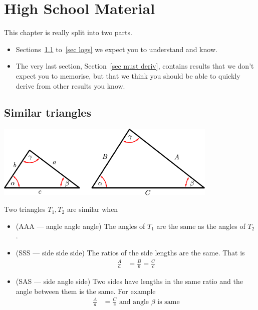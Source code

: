 %
%
\graphicspath{{figures/highschool/}}
\chapter{High School Material}\label{app highschool}
This chapter is really split into two parts.
\begin{itemize}
 \item Sections~\ref{sec simtri} to~\ref{sec logs} we expect you to understand and
know.
\item The very last section, Section~\ref{sec must deriv}, contains results that we don't
expect you to memorise, but that we think you should be able to quickly derive from other
results you know.
\end{itemize}

\section{Similar triangles}\label{sec simtri}
\begin{center}
 \includegraphics[height=35mm]{similar}
\end{center}
Two triangles $T_1,T_2$ are similar when
\begin{itemize}
 \item (AAA --- angle angle angle) The angles of $T_1$ are the same as the
angles of $T_2$.
 \item (SSS --- side side side) The ratios of the side lengths are the same.
That is
\begin{align*}
  \frac{A}{a} &= \frac{B}{b} = \frac{C}{c}
\end{align*}
 \item (SAS --- side angle side) Two sides have lengths in the same ratio and
the angle between them is the same. For example
\begin{align*}
  \frac{A}{a} &= \frac{C}{c} \text{ and angle $\beta$ is same}
\end{align*}
\end{itemize}


